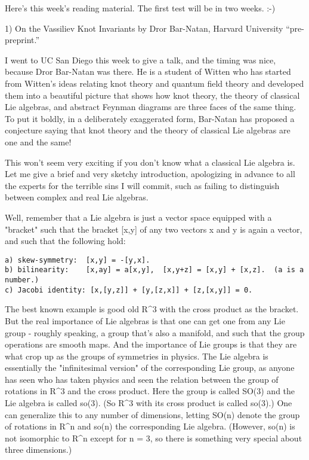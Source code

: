 

Here's this week's reading material.  The first test will be in two
weeks.  :-)

1)  On the Vassiliev Knot Invariants by Dror Bar-Natan, Harvard
University ``pre-preprint.''

I went to UC San Diego this week to give a talk, and the timing was
nice, because Dror Bar-Natan was there.  He is a student of Witten who
has started from Witten's ideas relating knot theory and quantum field
theory and developed them into a beautiful picture that shows how knot
theory, the theory of classical Lie algebras, and abstract Feynman
diagrams are three faces of the same thing.  To put it boldly, in a
deliberately exaggerated form, Bar-Natan has proposed a conjecture
saying that knot theory and the theory of classical Lie algebras are
one and the same!  

This won't seem very exciting if you don't know what a classical Lie
algebra is.  Let me give a brief and very sketchy introduction,
apologizing in advance to all the experts for the terrible sins I will
commit, such as failing to distinguish between complex and real Lie
algebras. 

Well, remember that a Lie algebra is just a vector space
equipped with a "bracket" such that the bracket [x,y] of any two vectors
x and y is again a vector, and such that the following hold:

\begin{verbatim}
a) skew-symmetry:  [x,y] = -[y,x].
b) bilinearity:    [x,ay] = a[x,y],  [x,y+z] = [x,y] + [x,z].  (a is a number.)
c) Jacobi identity: [x,[y,z]] + [y,[z,x]] + [z,[x,y]] = 0.
\end{verbatim}
    

The best known example is good old R^3 with the cross product as the
bracket.  But the real importance of Lie algebras is that one can get
one from any Lie group - roughly speaking, a group that's also a
manifold, and such that the group operations are smooth maps.  And the
importance of Lie groups is that they are what crop up as the groups of
symmetries in physics.  The Lie algebra is essentially the
"infinitesimal version" of the corresponding Lie group, as anyone has
seen who has taken physics and seen the relation between the group of
rotations in R^3 and the cross product.  Here the group is called SO(3)
and the Lie algebra is called so(3).  (So R^3 with its cross product is
called so(3).)  One can generalize this to any number of dimensions,
letting SO(n) denote the group of rotations in R^n and so(n) the
corresponding Lie algebra.  (However, so(n) is not isomorphic to R^n
except for n = 3, so there is something very special about three
dimensions.)  

